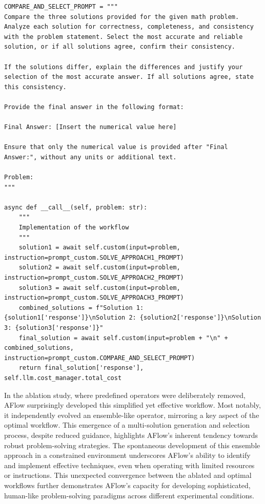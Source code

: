 \documentclass{article} %
\newcommand{\model}{{\sc AFlow}\xspace}
\theoremstyle{plain}
\theoremstyle{definition}
\theoremstyle{remark}
\begin{document}
\begin{tcolorbox}
\begin{verbatim}
COMPARE_AND_SELECT_PROMPT = """
Compare the three solutions provided for the given math problem. Analyze each solution for correctness, completeness, and consistency with the problem statement. Select the most accurate and reliable solution, or if all solutions agree, confirm their consistency.

If the solutions differ, explain the differences and justify your selection of the most accurate answer. If all solutions agree, state this consistency.

Provide the final answer in the following format:

Final Answer: [Insert the numerical value here]

Ensure that only the numerical value is provided after "Final Answer:", without any units or additional text.

Problem:
"""

async def __call__(self, problem: str):
    """
    Implementation of the workflow
    """
    solution1 = await self.custom(input=problem, instruction=prompt_custom.SOLVE_APPROACH1_PROMPT)
    solution2 = await self.custom(input=problem, instruction=prompt_custom.SOLVE_APPROACH2_PROMPT)
    solution3 = await self.custom(input=problem, instruction=prompt_custom.SOLVE_APPROACH3_PROMPT)
    combined_solutions = f"Solution 1: {solution1['response']}\nSolution 2: {solution2['response']}\nSolution 3: {solution3['response']}"
    final_solution = await self.custom(input=problem + "\n" + combined_solutions, instruction=prompt_custom.COMPARE_AND_SELECT_PROMPT)
    return final_solution['response'], self.llm.cost_manager.total_cost
\end{verbatim}
\end{tcolorbox}

In the ablation study, where predefined operators were deliberately removed, \model surprisingly developed this simplified yet effective workflow. Most notably, it independently evolved an ensemble-like operator, mirroring a key aspect of the optimal workflow. This emergence of a multi-solution generation and selection process, despite reduced guidance, highlights \model's inherent tendency towards robust problem-solving strategies. The spontaneous development of this ensemble approach in a constrained environment underscores \model's ability to identify and implement effective techniques, even when operating with limited resources or instructions. This unexpected convergence between the ablated and optimal workflows further demonstrates \model's capacity for developing sophisticated, human-like problem-solving paradigms across different experimental conditions.
\end{document}
